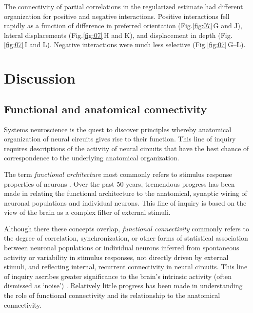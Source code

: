 \documentclass[10pt]{article}
\begin{document}
The connectivity of partial correlations in the regularized estimate had different organization for positive and negative interactions. Positive interactions fell rapidly as a function of difference in preferred orientation (Fig.\;\ref{fig:07}\,G and J), lateral displacements (Fig.\;\ref{fig:07}\,H and K), and displacement in depth (Fig.\;\ref{fig:07}\,I and L). Negative interactions were much less selective (Fig.\;\ref{fig:07}\,G--L).


\section*{Discussion}
\subsection*{Functional and anatomical connectivity}
Systems neuroscience is the quest to discover principles whereby anatomical organization of neural circuits gives rise to their function.  This line of inquiry requires descriptions of the activity of neural circuits that have the best chance of correspondence to the underlying anatomical organization. 

The term \emph{functional architecture} most commonly refers to stimulus response properties of neurons \cite{Reid:2012}. Over the past 50 years, tremendous progress has been made in relating the functional architecture to the anatomical, synaptic wiring of neuronal populations and individual neurons.  This line of inquiry is based on the view of the brain as a complex filter of external stimuli. 

Although there these concepts overlap, \emph{functional connectivity} commonly refers to the degree of correlation, synchronization, or other forms of statistical association between neuronal populations or individual neurons inferred from spontaneous activity or variability in stimulus responses,  not directly driven by external stimuli, and reflecting internal, recurrent connectivity in neural circuits. This line of inquiry ascribes greater significance to the brain's intrinsic activity (often dismissed as `noise') \cite{Yuste:2005}. Relatively little progress has been made in understanding the role of functional connectivity and its relationship to the anatomical connectivity. 
\end{document}
